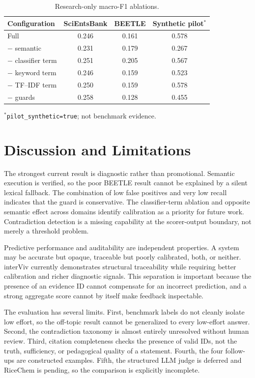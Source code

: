 \documentclass[conference,a4paper]{IEEEtran}
\begin{document}
\begin{table}[t]
\caption{Research-only macro-F1 ablations.}
\label{tab:ablation}
\centering
\small
\begin{tabular}{@{}lccc@{}}
\toprule
Configuration & SciEntsBank & BEETLE & Synthetic pilot$^{*}$ \\
\midrule
Full                 & 0.246 & 0.161 & 0.578 \\
$-$ semantic         & 0.231 & 0.179 & 0.267 \\
$-$ classifier term  & 0.251 & 0.205 & 0.567 \\
$-$ keyword term     & 0.246 & 0.159 & 0.523 \\
$-$ TF--IDF term     & 0.250 & 0.159 & 0.578 \\
$-$ guards           & 0.258 & 0.128 & 0.455 \\
\bottomrule
\end{tabular}
\vspace{0.25em}

\raggedright\footnotesize $^{*}$\texttt{pilot\_synthetic=true}; not benchmark evidence.
\end{table}

\section{Discussion and Limitations}

The strongest current result is diagnostic rather than promotional. Semantic
execution is verified, so the poor BEETLE result cannot be explained by a
silent lexical fallback. The combination of low false positives and very low
recall indicates that the guard is conservative. The classifier-term ablation
and opposite semantic effect across domains identify calibration as a priority
for future work. Contradiction detection is a missing capability at the
scorer-output boundary, not merely a threshold problem.

Predictive performance and auditability are independent properties. A system
may be accurate but opaque, traceable but poorly calibrated, both, or neither.
interViv currently demonstrates structural traceability while requiring better
calibration and richer diagnostic signals. This separation is important because
the presence of an evidence ID cannot compensate for an incorrect prediction,
and a strong aggregate score cannot by itself make feedback inspectable.

The evaluation has several limits. First, benchmark labels do not cleanly
isolate low effort, so the off-topic result cannot be generalized to every
low-effort answer. Second, the contradiction taxonomy is almost entirely
unresolved without human review. Third, citation completeness checks the
presence of valid IDs, not the truth, sufficiency, or pedagogical quality of a
statement. Fourth, the four follow-ups are constructed examples. Fifth, the
structured LLM judge is deferred and RiceChem is pending, so the comparison is
explicitly incomplete.
\end{document}
